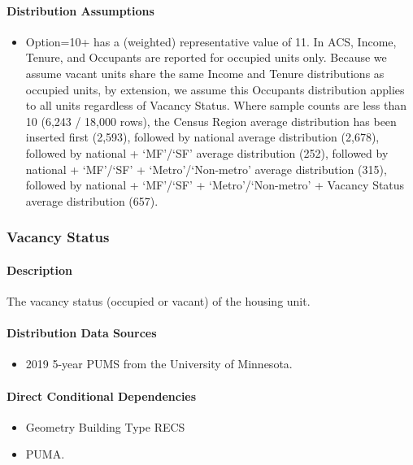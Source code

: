 \paragraph{Distribution Assumptions}
\begin{itemize}
\item
  Option=10+ has a (weighted) representative value of 11. In ACS,
  Income, Tenure, and Occupants are reported for occupied units only.
  Because we assume vacant units share the same Income and Tenure
  distributions as occupied units, by extension, we assume this
  Occupants distribution applies to all units regardless of Vacancy
  Status. Where sample counts are less than 10 (6,243 / 18,000 rows), the
  Census Region average distribution has been inserted first (2,593),
  followed by national average distribution (2,678), followed by national
  +
 `MF'/`SF'
  average distribution (252), followed by national +
  `MF'/`SF'
  +
  `Metro'/`Non-metro'
  average distribution (315), followed by national +
  `MF'/`SF'
  +
  `Metro'/`Non-metro'
  + Vacancy Status average distribution (657).
\end{itemize}

\subsubsection{Vacancy Status}\label{vacancy_status}
\paragraph{Description}
The vacancy status (occupied or vacant) of the housing unit.

\paragraph{Distribution Data Sources}
\begin{itemize}
\item
  2019 5-year PUMS from the University of Minnesota.
\end{itemize}

\paragraph{Direct Conditional Dependencies}
\begin{itemize}
    \item Geometry Building Type RECS
    \item PUMA.
\end{itemize}

